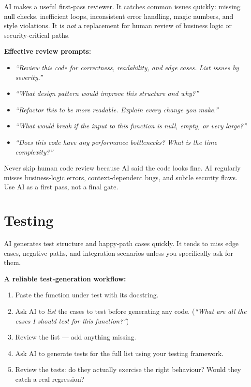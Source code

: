 AI makes a useful first-pass reviewer.
It catches common issues quickly: missing null checks, inefficient loops, inconsistent
error handling, magic numbers, and style violations.
It is \emph{not} a replacement for human review of business logic or security-critical
paths.

\textbf{Effective review prompts:}
\begin{itemize}
  \item \textit{``Review this code for correctness, readability, and edge cases. List issues by severity.''}
  \item \textit{``What design pattern would improve this structure and why?''}
  \item \textit{``Refactor this to be more readable. Explain every change you make.''}
  \item \textit{``What would break if the input to this function is null, empty, or very large?''}
  \item \textit{``Does this code have any performance bottlenecks? What is the time complexity?''}
\end{itemize}

\begin{warnbox}
Never skip human code review because AI said the code looks fine.
AI regularly misses business-logic errors, context-dependent bugs, and subtle security
flaws. Use AI as a first pass, not a final gate.
\end{warnbox}

\section{Testing}
\label{sec:testing}

AI generates test structure and happy-path cases quickly.
It tends to miss edge cases, negative paths, and integration scenarios unless you
specifically ask for them.

\textbf{A reliable test-generation workflow:}
\begin{enumerate}
  \item Paste the function under test with its docstring.
  \item Ask AI to \emph{list} the cases to test before generating any code.
    (\textit{``What are all the cases I should test for this function?''})
  \item Review the list --- add anything missing.
  \item Ask AI to generate tests for the full list using your testing framework.
  \item Review the tests: do they actually exercise the right behaviour?
    Would they catch a real regression?
\end{enumerate}

